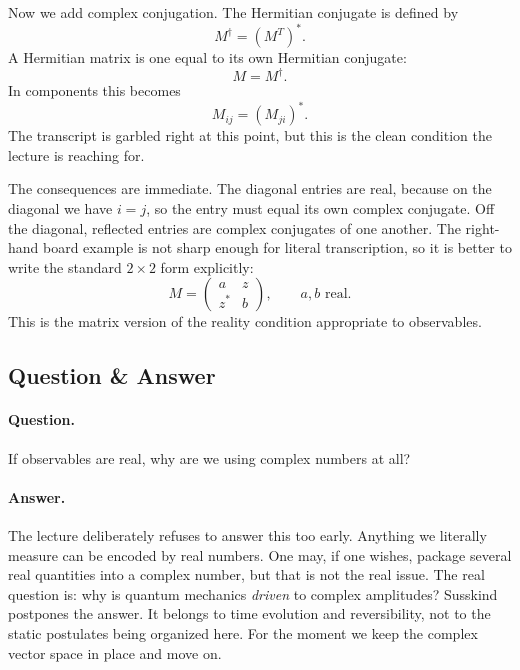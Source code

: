 Now we add complex conjugation. The Hermitian conjugate is defined by
\begin{equation}
M^\dagger=(M^T)^*.
\end{equation}
A Hermitian matrix is one equal to its own Hermitian conjugate:
\begin{equation}
M=M^\dagger.
\end{equation}
In components this becomes
\begin{equation}
M_{ij}=(M_{ji})^*.
\end{equation}
The transcript is garbled right at this point, but this is the clean condition the lecture is reaching for.

The consequences are immediate. The diagonal entries are real, because on the diagonal we have \(i=j\), so the entry must equal its own complex conjugate. Off the diagonal, reflected entries are complex conjugates of one another. The right-hand board example is not sharp enough for literal transcription, so it is better to write the standard \(2\times 2\) form explicitly:
\begin{equation}
M=
\begin{pmatrix}
a & z\\
z^* & b
\end{pmatrix},
\qquad a,b \text{ real}.
\end{equation}
This is the matrix version of the reality condition appropriate to observables.

\subsection{Question \& Answer}

\paragraph{Question.} If observables are real, why are we using complex numbers at all?

\paragraph{Answer.} The lecture deliberately refuses to answer this too early. Anything we literally measure can be encoded by real numbers. One may, if one wishes, package several real quantities into a complex number, but that is not the real issue. The real question is: why is quantum mechanics \emph{driven} to complex amplitudes? Susskind postpones the answer. It belongs to time evolution and reversibility, not to the static postulates being organized here. For the moment we keep the complex vector space in place and move on.


